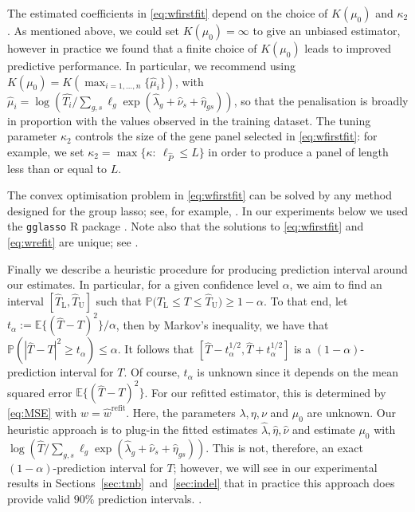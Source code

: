\documentclass[10pt,twoside,openright]{report}
\begin{document}
The estimated coefficients in \eqref{eq:wfirstfit} depend on the choice of $K(\mu_0)$ and $\kappa_2$.  As mentioned above, we could set $K(\mu_0) = \infty$ to give an unbiased estimator, however in practice we found that a finite choice of $K(\mu_0)$ leads to improved predictive performance. In particular, we recommend using $K(\mu_0) = K(\max_{i=1,\ldots, n}\{\hat{\mu}_i\})$, with $\hat{\mu}_i = \log(\hat{T_i}/\sum_{g,s}\ell_g\exp(\hat{\lambda}_g + \hat{\nu}_s + \hat{\eta}_{gs}))$, so that the penalisation is broadly in proportion with the values observed in the training dataset. The tuning parameter $\kappa_2$ controls the size of the gene panel selected in \eqref{eq:wfirstfit}: for example, we set $\kappa_2 = \max \{\kappa: \ \ell_{\hat{P}} \leq L \}$ in order to produce a panel of length less than or equal to $L$.


The convex optimisation problem in \eqref{eq:wfirstfit} can be solved by any method designed for the group \acrshort{lasso}; see, for example, \citet{yang_fast_2015}. In our experiments below we used the \texttt{gglasso} R package \citep{yang_gglasso_2020}. Note also that the solutions to \eqref{eq:wfirstfit} and \eqref{eq:wrefit} are unique; see \citet[Theorem~1]{roth_group-lasso_2008}.

Finally we describe a heuristic procedure for producing prediction interval around our estimates. In particular, for a given confidence level $\alpha$, we aim to find an interval $[\hat{T}_{\mathrm{L}}, \hat{T}_{\mathrm{U}}]$ such that $\mathbb{P}\bigl(\hat{T}_{\mathrm{L}} \leq T \leq \hat{T}_{\mathrm{U}}\bigr) \geq 1- \alpha.$  To that end, let $t_\alpha := \mathbb{E}\{(\hat{T} - T)^2\}/\alpha$, then by Markov's inequality, we have that  $ \mathbb{P}(|\hat{T} - T|^2 \geq t_\alpha) \leq \alpha$. It follows that $[\hat{T} - t_\alpha^{1/2} , \hat{T}+ t_\alpha^{1/2}]$ is a $(1-\alpha)$-prediction interval for $T$. Of course, $t_\alpha$ is unknown since it depends on the mean squared error $\mathbb{E}\{(\hat{T}-T)^2\}$. For our refitted estimator, this is determined by \eqref{eq:MSE} with $w = \hat{w}^{\text{refit}}$. Here, the parameters $\lambda, \eta, \nu$ and $\mu_0$ are unknown. Our heuristic approach is to plug-in the fitted estimates $\hat{\lambda}, \hat{\eta}, \hat{\nu}$ and estimate $\mu_0$ with $\log(\hat{T}/\sum_{g,s}\ell_g\exp(\hat{\lambda}_g + \hat{\nu}_s + \hat{\eta}_{gs}))$. This is not, therefore, an exact $(1-\alpha)$-prediction interval for $T$; however, we will see in our experimental results in Sections~\ref{sec:tmb}~and~\ref{sec:indel} that in practice this approach does provide valid $90\%$ prediction intervals. .  
\end{document}
